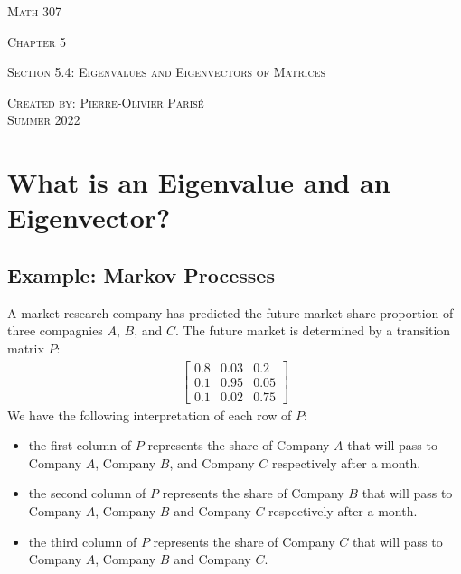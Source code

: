 \documentclass[12pt,a4paper]{article}
\begin{document}
\thispagestyle{empty}

\begin{center}
\vspace*{2.5cm}

{\Huge \textsc{Math 307}}

\vspace*{2cm}

{\LARGE \textsc{Chapter 5}} 

\vspace*{0.75cm}

\noindent\textsc{Section 5.4: Eigenvalues and Eigenvectors of Matrices}

\vspace*{0.75cm}

\tableofcontents

\vfill

\noindent \textsc{Created by: Pierre-Olivier Paris{\'e}} \\
\textsc{Summer 2022}
\end{center}

\newpage

	\section{What is an Eigenvalue and an Eigenvector?}
	
	\subsection{Example: Markov Processes}
	
	A market research company has predicted the future market share proportion of three compagnies $A$, $B$, and $C$. The future market is determined by a transition matrix $P$:
		\begin{align*}
		\left[\begin{matrix}0.8 & 0.03 & 0.2\\0.1 & 0.95 & 0.05\\0.1 & 0.02 & 0.75\end{matrix}\right]
		\end{align*}
	We have the following interpretation of each row of $P$:
		\begin{itemize}
		\item the first column of $P$ represents the share of Company $A$ that will pass to Company $A$, Company $B$, and Company $C$ respectively after a month.
		\item the second column of $P$ represents the share of Company $B$ that will pass to Company $A$, Company $B$ and Company $C$ respectively after a month.
		\item the third column of $P$ represents the share of Company $C$ that will pass to Company $A$, Company $B$ and Company $C$.
		\end{itemize}
		
\end{document}
